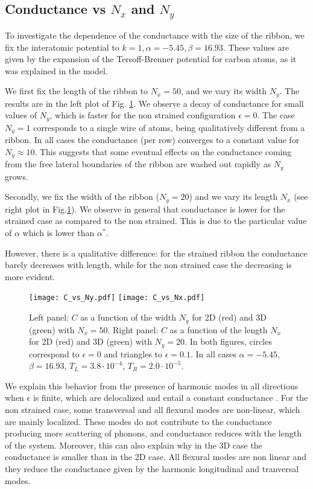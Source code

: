 \documentclass[12pt]{article}
\begin{document}
\subsection*{\textbf{Conductance vs $N_x$ and $N_y$}}

To investigate the dependence of the conductance with the size of the ribbon, we fix the interatomic potential to $k = 1, \alpha = -5.45, \beta = 16.93$. These values are given by the expansion of the Tersoff-Brenner potential for carbon atoms, as it was explained in the model.

We first fix the length of the ribbon to $N_x = 50$, and we vary its width $N_y$. The results are in the left plot of Fig. \ref{fig:size}. We observe a decay of conductance for small values of $N_y$, which is faster for the non strained configuration $\epsilon = 0$. The case $N_y = 1$ corresponds to a single wire of atoms, being qualitatively different from a ribbon. In all cases the conductance (per row) converges to a constant value for $N_y \approx 10$. This suggests that some eventual effects on the conductance coming from the free lateral boundaries of the ribbon are washed out rapidly as $N_y$ grows.

Secondly, we fix the width of the ribbon ($N_y = 20$) and we vary its length $N_x$ (see right plot in Fig.\ref{fig:size}). We observe in general that conductance is lower for the strained case as compared to the non strained. This is due to the particular value of $\alpha$ which is lower than $\alpha^*$.

However, there is a qualitative difference: for the strained ribbon the conductance barely decreases with length, while for the non strained case the decreasing is more evident.

\begin{figure}[ht]
 	\begin{center}
 		\texttt{[image: C\_vs\_Ny.pdf]}
 		\texttt{[image: C\_vs\_Nx.pdf]}
 	\end{center}  
\caption{Left panel: $C$ as a function of the width $N_y$ for 2D (red) and 3D (green) with $N_x =50$. Right panel: $C$ as a function of the length $N_x$ for 2D (red) and 3D (green) with $N_y =20$.  In both figures, circles correspond to $\epsilon=0$ and triangles to $\epsilon=0.1$. In all cases $\alpha=-5.45$, $\beta = 16.93$, $T_{L}=3.8 \cdot 10^{-4}$, $T_{R}=2.0\cdot 10^{-5}$.}
\label{fig:size}
\end{figure}

We explain this behavior from the presence of harmonic modes in all directions when $\epsilon$ is finite, which are delocalized and entail a constant conductance \cite{crystal}. For the non strained case, some transversal and all flexural modes are non-linear, which are mainly localized. These modes do not contribute to the conductance producing more scattering of phonons, and conductance reduces with the length of the system. Moreover, this can also explain why in the 3D case the conductance is smaller than in the 2D case. All flexural modes are non linear and they reduce the conductance given by the harmonic longitudinal and tranversal modes.
\end{document}
